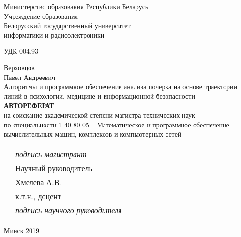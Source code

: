 \begin{titlepage}
  \begin{center}
    Министерство образования Республики Беларусь\\
    Учреждение образования\\
    Белорусский государственный университет \\
    информатики и радиоэлектроники\\[1em]

    \begin{flushleft}
        УДК 004.93
    \end{flushleft}
    Верховцов \\
    Павел Андреевич \\[1em]

    Алгоритмы и программное обеспечение анализа почерка на основе траектории линий в психологии, медицине и информационной безопасности\\[2em]

    \textbf{АВТОРЕФЕРАТ}\\
    {на соискание академической степени магистра технических наук}\\[2em]
    
    {по специальности 1-40 80 05 – Математическое и программное обеспечение вычислительных  машин, комплексов и компьютерных сетей}\\[3em]

    \begin{tabular}{ p{}p{} }
      & \emph{подпись магистрант} \\[1em]
      & Научный руководитель \\
      & Хмелева А.В.\\
      & к.т.н., доцент \\[3em]
      & \emph{подпись научного руководителя}
    \end{tabular}

    \vfill
    {\normalsize Минск 2019}
  \end{center}
\end{titlepage}
